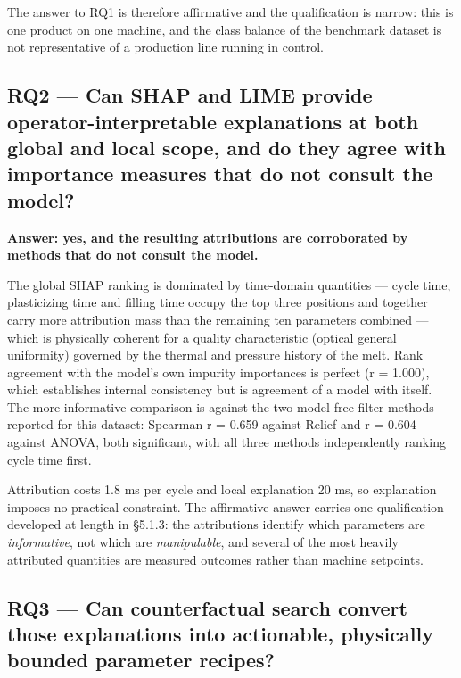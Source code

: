 The answer to RQ1 is therefore affirmative and the qualification is narrow: this is one product on one machine, and the class balance of the benchmark dataset is not representative of a production line running in control.

\hypertarget{rq2-can-shap-and-lime-provide-operator-interpretable-explanations-at-both-global-and-local-scope-and-do-they-agree-with-importance-measures-that-do-not-consult-the-model}{%
\subsection{RQ2 --- Can SHAP and LIME provide operator-interpretable explanations at both global and local scope, and do they agree with importance measures that do not consult the model?}\label{rq2-can-shap-and-lime-provide-operator-interpretable-explanations-at-both-global-and-local-scope-and-do-they-agree-with-importance-measures-that-do-not-consult-the-model}}

\textbf{Answer: yes, and the resulting attributions are corroborated by methods that do not consult the model.}

The global SHAP ranking is dominated by time-domain quantities --- cycle time, plasticizing time and filling time occupy the top three positions and together carry more attribution mass than the remaining ten parameters combined --- which is physically coherent for a quality characteristic (optical general uniformity) governed by the thermal and pressure history of the melt. Rank agreement with the model's own impurity importances is perfect (r = 1.000), which establishes internal consistency but is agreement of a model with itself. The more informative comparison is against the two model-free filter methods reported for this dataset: Spearman r = 0.659 against Relief and r = 0.604 against ANOVA, both significant, with all three methods independently ranking cycle time first.

Attribution costs 1.8 ms per cycle and local explanation 20 ms, so explanation imposes no practical constraint. The affirmative answer carries one qualification developed at length in §5.1.3: the attributions identify which parameters are \emph{informative}, not which are \emph{manipulable}, and several of the most heavily attributed quantities are measured outcomes rather than machine setpoints.

\hypertarget{rq3-can-counterfactual-search-convert-those-explanations-into-actionable-physically-bounded-parameter-recipes}{%
\subsection{RQ3 --- Can counterfactual search convert those explanations into actionable, physically bounded parameter recipes?}\label{rq3-can-counterfactual-search-convert-those-explanations-into-actionable-physically-bounded-parameter-recipes}}

